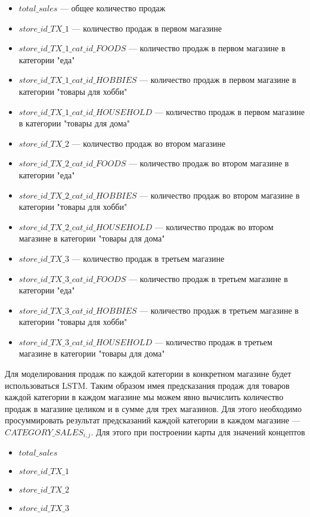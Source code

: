 \begin{itemize}
	\item $ total\_sales $ --- общее количество продаж
	\item $ store\_id\_TX\_1 $ --- количество продаж в первом магазине
	\item $ store\_id\_TX\_1\_cat\_id\_FOODS $ --- количество продаж в первом магазине в категории "еда"
	\item $ store\_id\_TX\_1\_cat\_id\_HOBBIES $ --- количество продаж в первом магазине в категории "товары для хобби"
	\item $ store\_id\_TX\_1\_cat\_id\_HOUSEHOLD $ --- количество продаж в первом магазине в категории "товары для дома"
	\item $ store\_id\_TX\_2 $ --- количество продаж во втором магазине
	\item $ store\_id\_TX\_2\_cat\_id\_FOODS $ --- количество продаж во втором магазине в категории "еда"
	\item $ store\_id\_TX\_2\_cat\_id\_HOBBIES $ --- количество продаж во втором магазине в категории "товары для хобби"
	\item $ store\_id\_TX\_2\_cat\_id\_HOUSEHOLD $ --- количество продаж во втором магазине в категории "товары для дома"
	\item $ store\_id\_TX\_3 $ --- количество продаж в третьем магазине
	\item $ store\_id\_TX\_3\_cat\_id\_FOODS $     --- количество продаж в третьем магазине в категории "еда"
	\item $ store\_id\_TX\_3\_cat\_id\_HOBBIES $   --- количество продаж в третьем магазине в категории "товары для хобби"
	\item $ store\_id\_TX\_3\_cat\_id\_HOUSEHOLD $ --- количество продаж в третьем магазине в категории "товары для дома"
\end{itemize}

Для моделирования продаж по каждой категории в конкретном магазине
будет использоваться LSTM.
Таким образом имея предсказания продаж для товаров каждой категории в каждом магазине
мы можем явно вычислить количество продаж в магазине целиком и в сумме для трех магазинов.
Для этого необходимо просуммировать результат предсказаний каждой категории
в каждом магазине --- $ CATEGORY\_SALES_{i,j} $.
Для этого при построении карты для значений концептов

\begin{itemize}
	\item $ total\_sales $
	\item $ store\_id\_TX\_1 $
	\item $ store\_id\_TX\_2 $
	\item $ store\_id\_TX\_3 $
\end{itemize}

